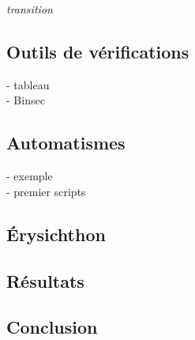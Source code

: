 \documentclass[10pt,a5paper]{article}
\begin{document}
\textit{transition}

\subsection*{Outils de vérifications}
- tableau \\
- Binsec
\subsection*{Automatismes}
- exemple \\
- premier scripts
\subsection*{Érysichthon}
\subsection*{Résultats}
\subsection*{Conclusion}
\end{document}
